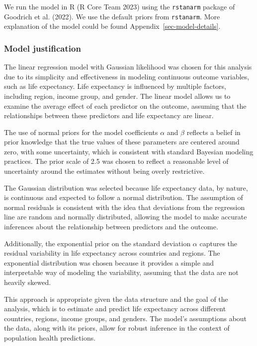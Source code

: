 \documentclass[
  letterpaper,
  DIV=11,
  numbers=noendperiod]{scrartcl}
\begin{document}
We run the model in R (R Core Team 2023) using the \texttt{rstanarm}
package of Goodrich et al. (2022). We use the default priors from
\texttt{rstanarm}. More explanation of the model could be found
Appendix~\ref{sec-model-details}.

\subsubsection{Model justification}\label{model-justification}

The linear regression model with Gaussian likelihood was chosen for this
analysis due to its simplicity and effectiveness in modeling continuous
outcome variables, such as life expectancy. Life expectancy is
influenced by multiple factors, including region, income group, and
gender. The linear model allows us to examine the average effect of each
predictor on the outcome, assuming that the relationships between these
predictors and life expectancy are linear.

The use of normal priors for the model coefficients \(\alpha\) and
\(\beta\) reflects a belief in prior knowledge that the true values of
these parameters are centered around zero, with some uncertainty, which
is consistent with standard Bayesian modeling practices. The prior scale
of 2.5 was chosen to reflect a reasonable level of uncertainty around
the estimates without being overly restrictive.

The Gaussian distribution was selected because life expectancy data, by
nature, is continuous and expected to follow a normal distribution. The
assumption of normal residuals is consistent with the idea that
deviations from the regression line are random and normally distributed,
allowing the model to make accurate inferences about the relationship
between predictors and the outcome.

Additionally, the exponential prior on the standard deviation \(\alpha\)
captures the residual variability in life expectancy across countries
and regions. The exponential distribution was chosen because it provides
a simple and interpretable way of modeling the variability, assuming
that the data are not heavily skewed.

This approach is appropriate given the data structure and the goal of
the analysis, which is to estimate and predict life expectancy across
different countries, regions, income groups, and genders. The model's
assumptions about the data, along with its priors, allow for robust
inference in the context of population health predictions.
\end{document}
